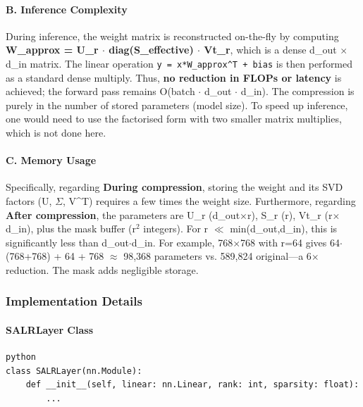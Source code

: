 \paragraph{B. Inference Complexity}

During inference, the weight matrix is reconstructed on-the-fly by computing \textbf{W\_approx = U\_r $\cdot$ diag(S\_effective) $\cdot$ Vt\_r}, which is a dense d\_out $\times$ d\_in matrix. The linear operation \texttt{y = x*W\_approx\textasciicircum{}T + bias} is then performed as a standard dense multiply. Thus, \textbf{no reduction in FLOPs or latency} is achieved; the forward pass remains O(batch $\cdot$ d\_out $\cdot$ d\_in). The compression is purely in the number of stored parameters (model size). To speed up inference, one would need to use the factorised form with two smaller matrix multiplies, which is not done here.

\paragraph{C. Memory Usage}

Specifically, regarding \textbf{During compression}, storing the weight and its SVD factors (U, $\Sigma$, V\textasciicircum{}T) requires a few times the weight size. Furthermore, regarding \textbf{After compression}, the parameters are U\_r (d\_out$\times$r), S\_r (r), Vt\_r (r$\times$d\_in), plus the mask buffer (r$^2$ integers). For r $\ll$ min(d\_out,d\_in), this is significantly less than d\_out$\cdot$d\_in. For example, 768$\times$768 with r=64 gives 64$\cdot$(768+768) + 64 + 768 $\approx$ 98,368 parameters vs. 589,824 original---a 6$\times$ reduction. The mask adds negligible storage.



\subsubsection*{Implementation Details}

\paragraph{SALRLayer Class}

\vspace{0.5em}
\begin{mdframed}[backgroundcolor=codebg, linecolor=codeframe, linewidth=1pt, roundcorner=4pt, innerleftmargin=2pt, innerrightmargin=5pt, innertopmargin=5pt, innerbottommargin=5pt]
\begin{lstlisting}
python
class SALRLayer(nn.Module):
    def __init__(self, linear: nn.Linear, rank: int, sparsity: float):
        ...
\end{lstlisting}
\end{mdframed}
\vspace{0.5em}

